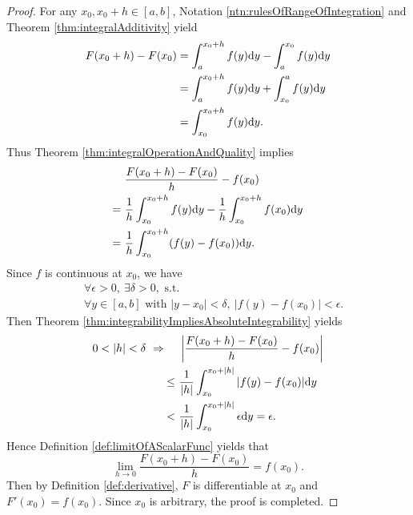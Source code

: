 \begin{proof}
  For any $x_{0},x_{0}+h\in [a,b]$,
  Notation \ref{ntn:rulesOfRangeOfIntegration} and Theorem
  \ref{thm:integralAdditivity} yield
  \begin{align*}
    F(x_{0}+h)-F(x_{0})
    &=\int_{a}^{x_{0}+h}f(y)\mathrm{d} y-\int_{a}^{x_{0}}f(y)\mathrm{d} y\\
    &=\int_{a}^{x_{0}+h}f(y)\mathrm{d} y+\int_{x_{0}}^{a}f(y)\mathrm{d} y\\
    &=\int_{x_{0}}^{x_{0}+h}f(y)\mathrm{d} y.
  \end{align*}
  Thus Theorem \ref{thm:integralOperationAndQuality} implies
  \begin{align*}
    &\ \frac{F(x_{0}+h)-F(x_{0})}{h}-f(x_{0})\\
    =&\ \frac{1}{h}\int_{x_{0}}^{x_{0}+h}f(y)\mathrm{d} y
      -\frac{1}{h}\int_{x_{0}}^{x_{0}+h}f(x_{0})\mathrm{d} y\\
    =&\ \frac{1}{h}\int_{x_{0}}^{{x_{0}+h}}(f(y)-f(x_{0}))\mathrm{d} y.
  \end{align*}
  Since $f$ is continuous at $x_{0}$, we have
  \begin{align*}
    &\ \forall \epsilon>0,\ \exists \delta>0,\text{ s.t. }\\
    &\ \forall y\in[a,b]\text{ with }|y-x_{0}|<\delta,\
      |f(y)-f(x_{0})|<\epsilon.
  \end{align*}
  Then Theorem \ref{thm:integrabilityImpliesAbsoluteIntegrability} yields
  \begin{align*}
    0<|h|<\delta\ \Rightarrow
    \quad &\ \left|\frac{F(x_{0}+h)-F(x_{0})}{h}-f(x_{0})\right|\\
    \le&\ \frac{1}{|h|}\int_{x_{0}}^{x_{0}+|h|}|f(y)-f(x_{0})|\dif y\\
    <&\ \frac{1}{|h|}\int_{x_{0}}^{x_{0}+|h|}\epsilon\dif y
    = \epsilon.
  \end{align*}
  Hence Definition \ref{def:limitOfAScalarFunc} yields that
  \begin{displaymath}
    \lim_{h\rightarrow 0}\frac{F(x_{0}+h)-F(x_{0})}{h}=f(x_{0}).
  \end{displaymath}
  Then by Definition \ref{def:derivative},
  $F$ is differentiable at $x_{0}$ and $F'(x_{0})=f(x_{0})$.
  Since $x_{0}$ is arbitrary, the proof is completed.
\end{proof}


